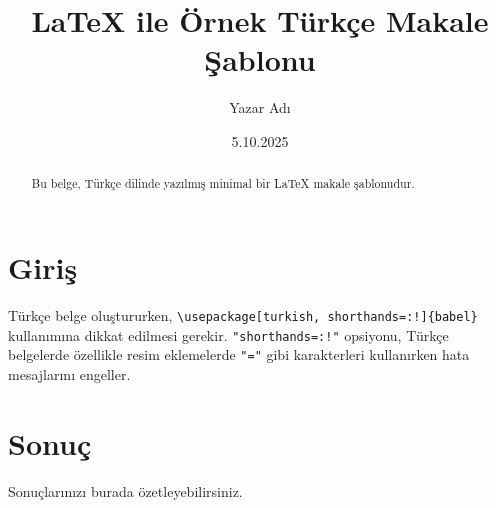 \documentclass[a4paper,12pt]{article}
\title{\LaTeX{} ile Örnek Türkçe Makale Şablonu}
\author{Yazar Adı}
\date{5.10.2025}
\begin{document}
\maketitle

\begin{abstract}
Bu belge, Türkçe dilinde yazılmış minimal bir \LaTeX{} makale şablonudur.
\end{abstract}

\section{Giriş}
\sloppy %
Türkçe belge oluştururken, \verb|\usepackage[turkish, shorthands=:!]{babel}| kullanımına dikkat edilmesi gerekir. \verb|"shorthands=:!"| opsiyonu, Türkçe belgelerde özellikle resim eklemelerde \verb|"="| gibi karakterleri kullanırken hata mesajlarını engeller.


\section{Sonuç}
Sonuçlarınızı burada özetleyebilirsiniz.
\end{document}
